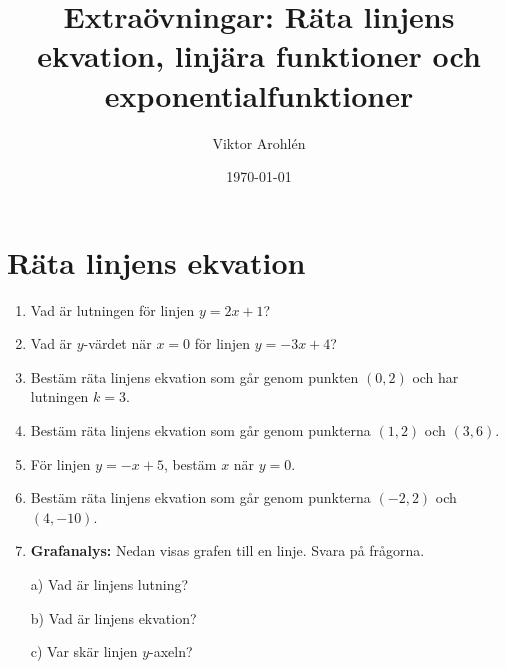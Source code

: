 \documentclass[a4paper,11pt]{article}
\title{Extraövningar: Räta linjens ekvation, linjära funktioner och exponentialfunktioner}
\author{Viktor Arohlén}
\date{\today}
\begin{document}
\maketitle

\section{Räta linjens ekvation}
\begin{enumerate}[label=\textbf{\arabic*.}]
    \item Vad är lutningen för linjen $y = 2x + 1$?
    \item Vad är $y$-värdet när $x = 0$ för linjen $y = -3x + 4$?
    \item Bestäm räta linjens ekvation som går genom punkten $(0,2)$ och har lutningen $k=3$.
    \item Bestäm räta linjens ekvation som går genom punkterna $(1,2)$ och $(3,6)$.
    \item För linjen $y = -x + 5$, bestäm $x$ när $y = 0$.
    \item Bestäm räta linjens ekvation som går genom punkterna $(-2,2)$ och $(4,-10)$.
    \item \textbf{Grafanalys:} Nedan visas grafen till en linje. Svara på frågorna.
    \begin{center}
    \end{center}
    a) Vad är linjens lutning?
    
    b) Vad är linjens ekvation?
    
    c) Var skär linjen $y$-axeln?
\end{enumerate}
\newpage
\end{document}
